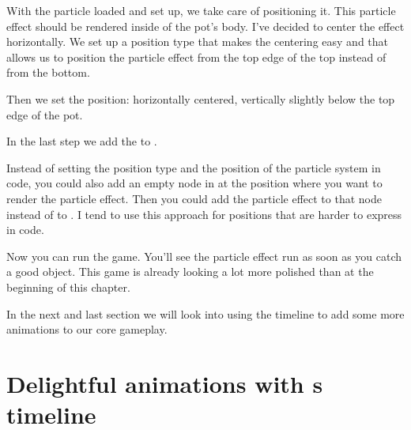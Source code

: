 With the particle loaded and set up, we take care of positioning it. This
particle effect should be rendered inside of the pot's body. I've decided to
center the effect horizontally. We set up a position type that makes the
centering easy and that allows us to position the particle effect from the top
edge of the top instead of from the bottom.

Then we set the position: horizontally centered, vertically slightly below the
top edge of the pot.

In the last step we add the  to .

\begin{details}[frametitle={An alternative positioning approach}]
Instead of setting the position type and the position of the particle system in
code, you could also add an empty node in \SB{} at the position where you want
to render the particle effect. Then you could add the particle effect to that
node instead of to . I tend to use this approach for
positions that are harder to express in code.
\end{details}

Now you can run the game. You'll see the particle effect run as soon as you
catch a good object. This game is already looking a lot more polished than at
the beginning of this chapter.

In the next and last section we will look into using the \SB{} timeline to add
some more animations to our core gameplay.

\section{Delightful animations with \SB{}s timeline}


